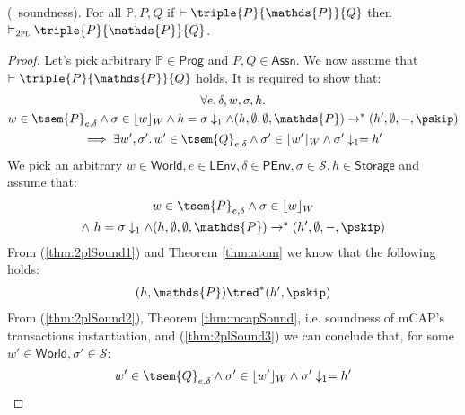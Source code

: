 \begin{thm}
	\label{thm:2plSound}
	(\tpl\ soundness).
	For all $\mathds{P}, P, Q$ if $\vdash \triple{P}{\mathds{P}}{Q}$ then $\vDash_\textsc{2pl} \triple{P}{\mathds{P}}{Q}$.
	\begin{proof}
		Let's pick arbitrary $\mathds{P} \in \mathsf{Prog}$ and $P, Q \in \mathsf{Assn}$. We now assume that $\vdash \triple{P}{\mathds{P}}{Q}$ holds. It is required to show that:
		\begin{gather}
			\forall e, \delta, w, \sigma, h \ldotp \\
			w \in \tsem{P}_{e, \delta} \land \sigma \in \lfloor w \rfloor_W \land h = \sigma \downarrow_1 \land (h, \emptyset, \emptyset, \mathds{P}) \rightarrow^* (h', \emptyset, -, \pskip) \\
			\implies \exists w', \sigma' \ldotp w' \in \tsem{Q}_{e, \delta} \land \sigma' \in \lfloor w' \rfloor_W \land \sigma' \downarrow_1 = h'
		\end{gather}
		We pick an arbitrary $w \in \mathsf{World}, e \in \mathsf{LEnv}, \delta \in \mathsf{PEnv}, \sigma \in \mathcal{S}, h \in \mathsf{Storage}$ and assume that:
		\begin{gather}
			\label{thm:2plSound2} w \in \tsem{P}_{e, \delta} \land \sigma \in \lfloor w \rfloor_W \\
			\label{thm:2plSound1} \land\ h = \sigma \downarrow_1 \land (h, \emptyset, \emptyset, \mathds{P}) \rightarrow^* (h', \emptyset, -, \pskip)
		\end{gather}
		From (\ref{thm:2plSound1}) and Theorem \ref{thm:atom} we know that the following holds:
		\begin{gather}
			\label{thm:2plSound3}
			(h, \mathds{P}) \tred^* (h', \pskip)
		\end{gather}
		From (\ref{thm:2plSound2}), Theorem \ref{thm:mcapSound}, i.e. soundness of mCAP's transactions instantiation, and (\ref{thm:2plSound3}) we can conclude that, for some $w' \in \mathsf{World}, \sigma' \in \mathcal{S}$:
		\[
			w' \in \tsem{Q}_{e, \delta} \land \sigma' \in \lfloor w' \rfloor_W \land \sigma' \downarrow_1 = h'
		\]
	\end{proof}
\end{thm}